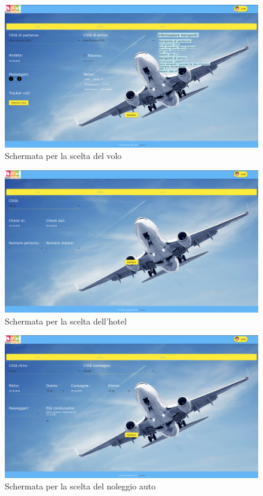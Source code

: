 \documentclass[11pt]{article}
\begin{document}
\begin{figure}[!ht]
	\includegraphics[width=1\textwidth]{./Mockup/Voli-registrato} %
	\caption{Schermata per la scelta del volo}
	\label{fig:voli}
\end{figure}

\begin{figure}[!ht]
	\includegraphics[width=1\textwidth]{./Mockup/Hotel-registrato} %
	\caption{Schermata per la scelta dell'hotel}
	\label{fig:hotel}
\end{figure}

\begin{figure}[!ht]
	\includegraphics[width=1\textwidth]{./Mockup/Auto-registrato} %
	\caption{Schermata per la scelta del noleggio auto}
	\label{fig:auto}
\end{figure}
\end{document}
